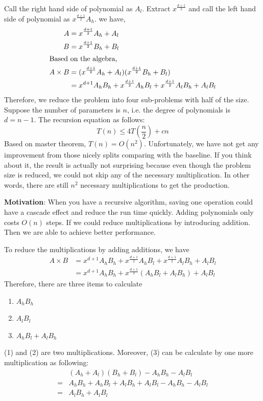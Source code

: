 \documentclass[en,hazy,blue,screen,14pt]{elegantnote}
\begin{document}
Call the right hand side of polynomial as $A_l$. Extract $x^{\frac{d+1}{2}}$ 
and call the left hand side of polynomial as $x^{\frac{d+1}{2}} A_h$. we have,
\begin{align*}
 A &= x^{\frac{d+1}{2}} A_h + A_l\\
 B &= x^{\frac{d+1}{2}} B_h + B_l\\
 \intertext{Based on the algebra,}
 A \times B &= (x^{\frac{d+1}{2}} A_h + A_l)(x^{\frac{d+1}{2}} B_h + B_l)\\
 &= x^{d+1}A_h B_h + x^{\frac{d+1}{2}}A_h B_l + x^{\frac{d+1}{2}}A_l B_h + A_l 
B_l
\end{align*}
Therefore, we reduce the problem into four sub-problems with half of the size. 
Suppose the number of parameters is $n$, i.e. the degree of polynomials is $d = 
n - 1$. The recursion equation as follows:
\[T(n) \le 4T(\frac{n}{2}) + cn\]
Based on master theorem, $T(n) = O(n^2)$. Unfortunately, we have not get any 
improvement from those nicely splits comparing with the baseline. If you think 
about it, the result is actually not surprising because even though the problem 
size is reduced, we could not skip any of the necessary multiplication. In 
other words, there are still $n^2$ necessary multiplications to get the 
production.

\textbf{Motivation}: When you have a recursive algorithm, saving  one operation 
could have a cascade effect and reduce the run time quickly. Adding polynomials 
only costs $O(n)$ steps. If we could reduce multiplications by introducing 
addition. Then we are able to achieve better performance. 

To reduce the multiplications by adding additions, we have
\begin{align*}
 A \times B &= x^{d+1}A_h B_h + x^{\frac{d+1}{2}}A_h B_l + x^{\frac{d+1}{2}}A_l 
B_h + A_lB_l\\
            &= x^{d+1}A_h B_h + x^{\frac{d+1}{2}}(A_h B_l + A_l B_h) + A_l 
B_l
\end{align*}
Therefore, there are three items to calculate
\begin{enumerate}[(1)]
 \item $A_h B_h$
 \item $A_l B_l$
 \item $A_h B_l + A_l B_h$
\end{enumerate}
(1) and (2) are two multiplications. Moreover, (3) can be calculate by one more 
multiplication as following:
\begin{align*}
 &  (A_h + A_l) (B_h + B_l) - A_h B_h - A_l B_l\\
 =& A_hB_h + A_hB_l + A_lB_h + A_lB_l - A_h B_h - A_l B_l\\
 =& A_lB_h + A_lB_l
\end{align*}
\end{document}
